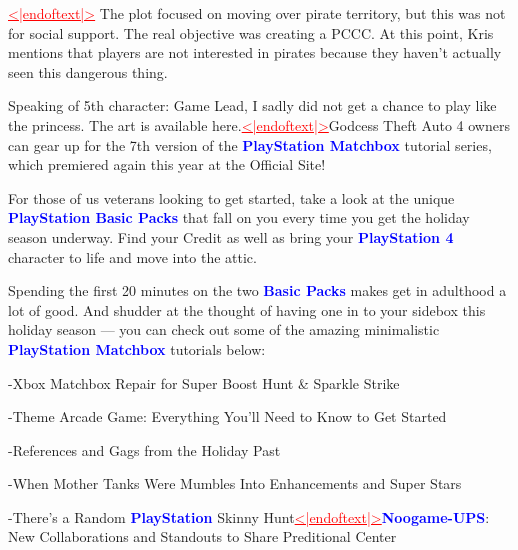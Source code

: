 \documentclass{article}
\begin{document}
\begin{samplebox}[title={\textsc{RePlaid} (s.c.), ancestral sampler, steps $T = 64$ (GenPPL: $48.5$, Entropy: $5.50$, MAUVE: $0.88$)}]
\vspace{1em}

\textcolor{red}{\uline{<|endoftext|>}} The plot focused on moving over pirate territory, but this was not for social support. The real objective was creating a PCCC. At this point, Kris mentions that players are not interested in pirates because they haven't actually seen this dangerous thing.

\vspace{1em}
Speaking of 5th character: Game Lead, I sadly did not get a chance to play like the princess. The art is available here.\textcolor{red}{\uline{<|endoftext|>}}Godcess Theft Auto 4 owners can gear up for the 7th version of the \textcolor{blue}{\textbf{PlayStation Matchbox}} tutorial series, which premiered again this year at the Official Site!

\vspace{1em}
For those of us veterans looking to get started, take a look at the unique \textcolor{blue}{\textbf{PlayStation Basic Packs}} that fall on you every time you get the holiday season underway. Find your Credit as well as bring your \textcolor{blue}{\textbf{PlayStation 4}} character to life and move into the attic.

\vspace{1em}
Spending the first 20 minutes on the two \textcolor{blue}{\textbf{Basic Packs}} makes get in adulthood a lot of good. And shudder at the thought of having one in to your sidebox this holiday season --- you can check out some of the amazing minimalistic \textcolor{blue}{\textbf{PlayStation Matchbox}} tutorials below:

\vspace{1em}
-Xbox Matchbox Repair for Super Boost Hunt \& Sparkle Strike

\vspace{1em}
-Theme Arcade Game: Everything You'll Need to Know to Get Started

\vspace{1em}
-References and Gags from the Holiday Past

\vspace{1em}
-When Mother Tanks Were Mumbles Into Enhancements and Super Stars

\vspace{1em}
-There's a Random \textcolor{blue}{\textbf{PlayStation}} Skinny Hunt\textcolor{red}{\uline{<|endoftext|>}}\textcolor{blue}{\textbf{Noogame-UPS}}: New Collaborations and Standouts to Share Preditional Center


\end{samplebox}
\end{document}
